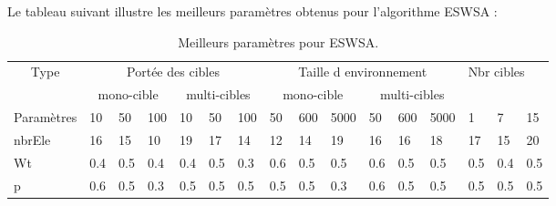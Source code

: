 	
	Le tableau suivant illustre les meilleurs paramètres obtenus pour l'algorithme ESWSA :
	\begin{table}[h]
		\begin{tabular}{|l|p{0.3cm}|p{0.3cm}|p{0.3cm}|p{0.3cm}|p{0.3cm}|p{0.3cm}|p{0.5cm}|p{0.5cm}|p{0.6cm}|p{0.5cm}|p{0.5cm}|p{0.6cm}|p{0.4cm}|p{0.4cm}|p{0.4cm}|}
			 \hline
			\multicolumn{1}{|c|}{\multirow{2}{*}{Type}} & \multicolumn{6}{c|}{Portée des cibles}                              & \multicolumn{6}{c|}{Taille d environnement}                         & \multicolumn{3}{l|}{\multirow{2}{*}{Nbr cibles}} \\ \cline{2-13}
			\multicolumn{1}{|c|}{}                      & \multicolumn{3}{c|}{mono-cible} & \multicolumn{3}{c|}{multi-cibles} & \multicolumn{3}{c|}{mono-cible} & \multicolumn{3}{c|}{multi-cibles} & \multicolumn{3}{l|}{}                            \\ \hline
			\multicolumn{1}{|c|}{Paramètres}            & 10        & 50       & 100      & 10         & 50        & 100      & 50        & 600      & 5000     & 50        & 600       & 5000      & 1              & 7              & 15             \\ \hline \hline
			nbrEle                                      & 16        & 15       & 10       & 19         & 17        & 14       & 12        & 14       & 19       & 16        & 16        & 18        & 17             & 15             & 20             \\ \hline
			Wt                                          & 0.4       & 0.5      & 0.4      & 0.4        & 0.5       & 0.3      & 0.6       & 0.5      & 0.5      & 0.6       & 0.5       & 0.5       & 0.5            & 0.4            & 0.5            \\ \hline
			p                                           & 0.6       & 0.5      & 0.3      & 0.5        & 0.5       & 0.5      & 0.5       & 0.5      & 0.3      & 0.6       & 0.5       & 0.5       & 0.5            & 0.5            & 0.5            \\ \hline
		\end{tabular}
		\caption{Meilleurs paramètres pour ESWSA.}
	\end{table}

	
	
	
	\vspace{-0.5cm}
	
